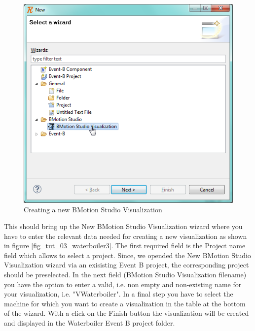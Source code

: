 \begin{figure}[!h]
\begin{center}
	\includegraphics{img/tutorial/tut_03_waterboiler2.png}
	\caption{Creating a new BMotion Studio Visualization}
	\label{fig_tut_03_waterboiler2}
\end{center}
\end{figure}

This should bring up the \textsf{New BMotion Studio Visualization wizard} where you have to enter the relevant data needed for creating a new visualization as shown in figure \ref{fig_tut_03_waterboiler3}. The first required field is the Project name field which allows to select a project. Since, we opended the New BMotion Studio Visualization wizard via an exisisting Event B project, the corresponding project should be preselected. In the next field (BMotion Studio Visualization filename) you have the option to enter a valid, i.e. non empty and non-existing name for your visualization, i.e. "VWaterboiler". In a final step you have to select the machine for which you want to create a visualization in the table at the bottom of the wizard. With a click on the Finish button the visualization will be created and displayed in the Waterboiler Event B project folder. 

